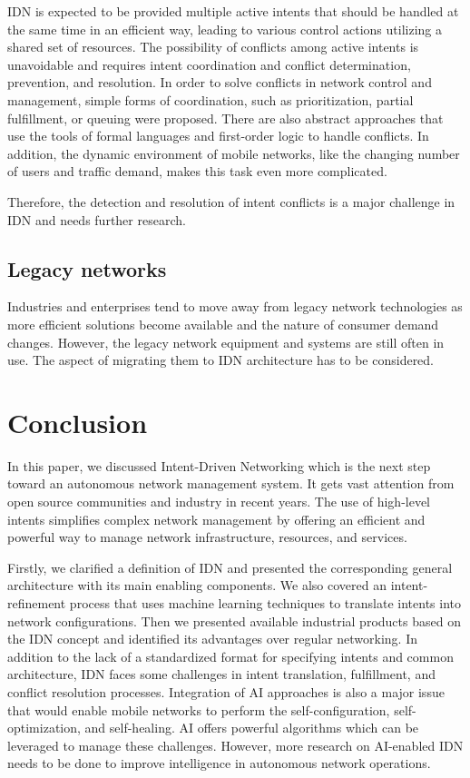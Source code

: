 IDN is expected to be provided multiple active intents that should be handled at the same time in an efficient way, leading to various control actions utilizing a shared set of resources. The possibility of conflicts among active intents is unavoidable and requires intent coordination and conflict determination, prevention, and resolution. In order to solve conflicts in network control and management, simple forms of coordination, such as prioritization, partial fulfillment, or queuing were proposed. There are also abstract approaches that use the tools of formal languages and first-order logic to handle conflicts. In addition, the dynamic environment of mobile networks, like the changing number of users and traffic demand, makes this task even more complicated.\cite{Mwanje2021}

Therefore, the detection and resolution of intent conflicts is a major challenge in IDN and needs further research.


\subsection{Legacy networks}
Industries and enterprises tend to move away from legacy network technologies as more efficient solutions become available and the nature of consumer demand changes. However, the legacy network equipment and systems are still often in use. The aspect of migrating them to IDN architecture has to be considered.\cite{Saha2018}


\section{Conclusion}
\label{sec:Conclusion}

In this paper, we discussed Intent-Driven Networking which is the next step toward an autonomous network management system. It gets vast attention from open source communities and industry in recent years. The use of high-level intents simplifies complex network management by offering an efficient and powerful way to manage network infrastructure, resources, and services.

Firstly, we clarified a definition of IDN and presented the corresponding general architecture with its main enabling components. We also covered an intent-refinement process that uses machine learning techniques to translate intents into network configurations. Then we presented available industrial products based on the IDN concept and identified its advantages over regular networking. In addition to the lack of a standardized format for specifying intents and common architecture, IDN faces some challenges in intent translation, fulfillment, and conflict resolution processes. Integration of AI approaches is also a major issue that would enable mobile networks to perform the self-configuration, self-optimization, and self-healing. AI offers powerful algorithms which can be leveraged to manage these challenges. However, more research on AI-enabled IDN needs to be done to improve intelligence in autonomous network operations.

\printbibliography[heading=bibintoc]





